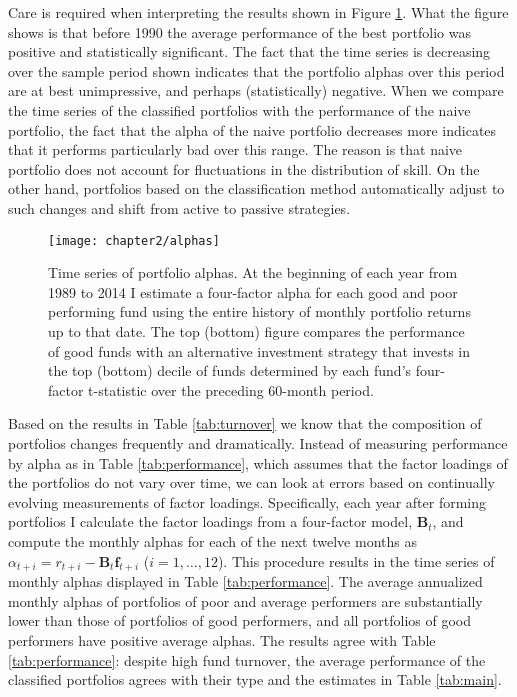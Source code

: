 		Care is required when interpreting the results shown in Figure \ref{fig:performance}. What the figure shows is that before 1990 the average performance of the best portfolio was positive and statistically significant. The fact that the time series is decreasing over the sample period shown indicates that the portfolio alphas over this period are at best unimpressive, and perhaps (statistically) negative. When we compare the time series of the classified portfolios with the performance of the naive portfolio, the fact that the alpha of the naive portfolio decreases more indicates that it performs particularly bad over this range. The reason is that naive portfolio does not account for fluctuations in the distribution of skill. On the other hand, portfolios based on the classification method automatically adjust to such changes and shift from active to passive strategies.

		\begin{figure}[t]
			\small
			\centering
			\texttt{[image: chapter2/alphas]}
			\captionsetup{skip=-20pt, font=footnotesize, justification=justified, width=\textwidth}
			\caption[Time series of portfolio alphas]{Time series of portfolio alphas. At the beginning of each year from 1989 to 2014 I estimate a four-factor alpha for each good and poor performing fund using the entire history of monthly portfolio returns up to that date. The top (bottom) figure compares the performance of good funds with an alternative investment strategy that invests in the top (bottom) decile of funds determined by each fund’s four-factor t-statistic over the preceding 60-month period.}
			\label{fig:performance}
		\end{figure}

		Based on the results in Table \ref{tab:turnover} we know that the composition of portfolios changes frequently and dramatically.  Instead of measuring performance by alpha as in Table \ref{tab:performance}, which assumes that the factor loadings of the portfolios do not vary over time, we can look at errors based on continually evolving measurements of factor loadings.  Specifically, each year after forming portfolios I calculate the factor loadings from a four-factor model, $\mathbf{B}_t$, and compute the monthly alphas for each of the next twelve months as $\alpha_{t+i} = r_{t+i} - \mathbf{B}_t \mathbf{f}_{t+i}$ ($i=1, \dots, 12$).  This procedure results in the time series of monthly alphas displayed in Table \ref{tab:performance}. The average annualized monthly alphas of portfolios of poor and average performers are substantially lower than those of portfolios of good performers, and all portfolios of good performers have positive average alphas.  The results agree with Table \ref{tab:performance}: despite high fund turnover, the average performance of the classified portfolios agrees with their type and the estimates in Table \ref{tab:main}.

